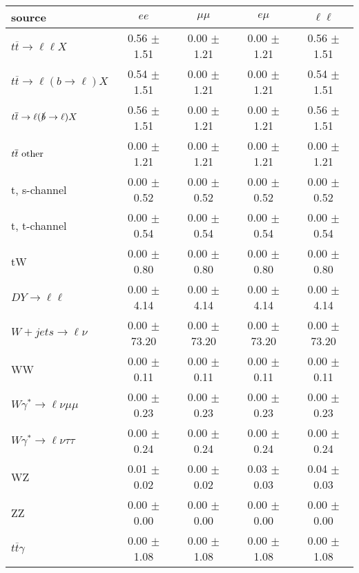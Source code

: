 \begin{tabular}{l|cccc} \hline\hline
source & $ee$ & $\mu\mu$ & $e\mu$ & $\ell\ell $ \\
\hline
$t\overline{t} \rightarrow \ell \ell X$ &  0.56 $\pm$  1.51 &  0.00 $\pm$  1.21 &  0.00 $\pm$  1.21 &  0.56 $\pm$  1.51 \\
$t\overline{t} \rightarrow \ell (b \rightarrow \ell) X$ &  0.54 $\pm$  1.51 &  0.00 $\pm$  1.21 &  0.00 $\pm$  1.21 &  0.54 $\pm$  1.51 \\
$t\overline{t} \rightarrow \ell (\slashed b \rightarrow \ell) X$ &  0.56 $\pm$  1.51 &  0.00 $\pm$  1.21 &  0.00 $\pm$  1.21 &  0.56 $\pm$  1.51 \\
        $t\overline{t}\ \rm{other}$ &  0.00 $\pm$  1.21 &  0.00 $\pm$  1.21 &  0.00 $\pm$  1.21 &  0.00 $\pm$  1.21 \\
\hline
                       t, s-channel &  0.00 $\pm$  0.52 &  0.00 $\pm$  0.52 &  0.00 $\pm$  0.52 &  0.00 $\pm$  0.52 \\
                       t, t-channel &  0.00 $\pm$  0.54 &  0.00 $\pm$  0.54 &  0.00 $\pm$  0.54 &  0.00 $\pm$  0.54 \\
                                 tW &  0.00 $\pm$  0.80 &  0.00 $\pm$  0.80 &  0.00 $\pm$  0.80 &  0.00 $\pm$  0.80 \\
\hline
         $DY \rightarrow \ell \ell$ &  0.00 $\pm$  4.14 &  0.00 $\pm$  4.14 &  0.00 $\pm$  4.14 &  0.00 $\pm$  4.14 \\
      $W+jets \rightarrow \ell \nu$ &  0.00 $\pm$ 73.20 &  0.00 $\pm$ 73.20 &  0.00 $\pm$ 73.20 &  0.00 $\pm$ 73.20 \\
                                 WW &  0.00 $\pm$  0.11 &  0.00 $\pm$  0.11 &  0.00 $\pm$  0.11 &  0.00 $\pm$  0.11 \\
\hline
$W\gamma^{*} \rightarrow \ell \nu \mu\mu$ &  0.00 $\pm$  0.23 &  0.00 $\pm$  0.23 &  0.00 $\pm$  0.23 &  0.00 $\pm$  0.23 \\
$W\gamma^{*} \rightarrow \ell \nu \tau\tau$ &  0.00 $\pm$  0.24 &  0.00 $\pm$  0.24 &  0.00 $\pm$  0.24 &  0.00 $\pm$  0.24 \\
                                 WZ &  0.01 $\pm$  0.02 &  0.00 $\pm$  0.02 &  0.03 $\pm$  0.03 &  0.04 $\pm$  0.03 \\
                                 ZZ &  0.00 $\pm$  0.00 &  0.00 $\pm$  0.00 &  0.00 $\pm$  0.00 &  0.00 $\pm$  0.00 \\
\hline
              $t\overline{t}\gamma$ &  0.00 $\pm$  1.08 &  0.00 $\pm$  1.08 &  0.00 $\pm$  1.08 &  0.00 $\pm$  1.08 \\

\end{tabular}
